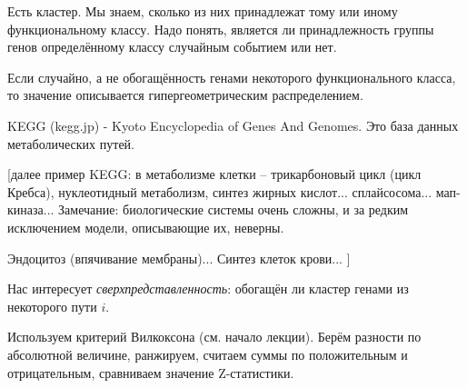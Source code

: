 \documentclass[main.tex]{subfiles}
\begin{document}
Есть кластер. Мы знаем, сколько из них принадлежат тому или иному функциональному классу.
Надо понять, является ли принадлежность группы генов определённому классу случайным событием или нет.

Если случайно, а не обогащённость генами некоторого функционального класса, то значение описывается гипергеометрическим распределением.

KEGG (kegg.jp) - Kyoto Encyclopedia of Genes And Genomes.
Это база данных метаболических путей.

[далее пример KEGG: в метаболизме клетки -- трикарбоновый цикл (цикл Кребса), нуклеотидный метаболизм, синтез жирных кислот... сплайсосома... мап-киназа...
Замечание: биологические системы очень сложны, и за редким исключением модели, описывающие их, неверны.

Эндоцитоз (впячивание мембраны)...
Синтез клеток крови... ]


Нас интересует \emph{сверхпредставленность}: обогащён ли кластер генами из некоторого пути $ i $.

Используем критерий Вилкоксона (см. начало лекции).
Берём разности по абсолютной величине, ранжируем, считаем суммы по положительным и отрицательным, сравниваем значение Z-статистики.
\end{document}
